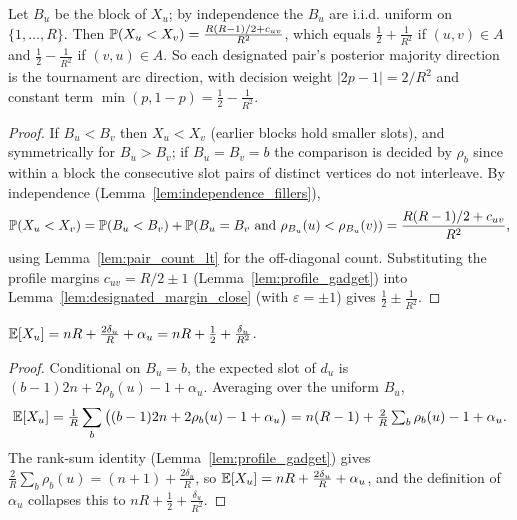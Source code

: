 \begin{lemma}
\label{lem:designated_margin}
\leanok
{}
Let $B_u$ be the block of $X_u$; by independence the $B_u$ are i.i.d. uniform on
$\{1,\dots,R\}$. Then $\mathbb{P}(X_u < X_v) = \frac{R(R-1)/2 + c_{uv}}{R^2}$, which
equals $\tfrac12 + \tfrac1{R^2}$ if $(u,v) \in A$ and $\tfrac12 - \tfrac1{R^2}$ if
$(v,u) \in A$. So each designated pair's posterior majority direction is the
tournament arc direction, with decision weight $|2p-1| = 2/R^2$ and constant term
$\min(p,1-p) = \tfrac12 - \tfrac1{R^2}$.
\end{lemma}
\begin{proof}
\leanok
{}
If $B_u < B_v$ then $X_u < X_v$ (earlier blocks hold smaller slots), and
symmetrically for $B_u > B_v$; if $B_u = B_v = b$ the comparison is decided by
$\rho_b$ since within a block the consecutive slot pairs of distinct vertices do
not interleave. By independence (Lemma~\ref{lem:independence_fillers}),
\[
  \mathbb{P}(X_u<X_v) = \mathbb{P}(B_u<B_v) + \mathbb{P}(B_u=B_v \text{ and } \rho_{B_u}(u)<\rho_{B_u}(v))
  = \frac{R(R-1)/2 + c_{uv}}{R^2},
\]
using Lemma~\ref{lem:pair_count_lt} for the off-diagonal count. Substituting the
profile margins $c_{uv} = R/2 \pm 1$ (Lemma~\ref{lem:profile_gadget}) into
Lemma~\ref{lem:designated_margin_close} (with $\varepsilon = \pm 1$) gives
$\tfrac12 \pm \tfrac1{R^2}$.
\end{proof}

\begin{lemma}
\label{lem:expected_slot}
\leanok
{}
$\mathbb{E}[X_u] = nR + \tfrac{2\delta_u}{R} + \alpha_u = nR + \tfrac12 + \tfrac{\delta_u}{R^2}$.
\end{lemma}
\begin{proof}
\leanok
{}
Conditional on $B_u = b$, the expected slot of $d_u$ is
$(b-1)2n + 2\rho_b(u) - 1 + \alpha_u$. Averaging over the uniform $B_u$,
\[
  \mathbb{E}[X_u] = \tfrac1R\sum_b\big((b-1)2n + 2\rho_b(u) - 1 + \alpha_u\big)
  = n(R-1) + \tfrac2R\textstyle\sum_b\rho_b(u) - 1 + \alpha_u.
\]
The rank-sum identity (Lemma~\ref{lem:profile_gadget}) gives
$\tfrac2R\sum_b\rho_b(u) = (n+1) + \tfrac{2\delta_u}{R}$, so
$\mathbb{E}[X_u] = nR + \tfrac{2\delta_u}{R} + \alpha_u$, and the definition of $\alpha_u$
collapses this to $nR + \tfrac12 + \tfrac{\delta_u}{R^2}$.
\end{proof}

